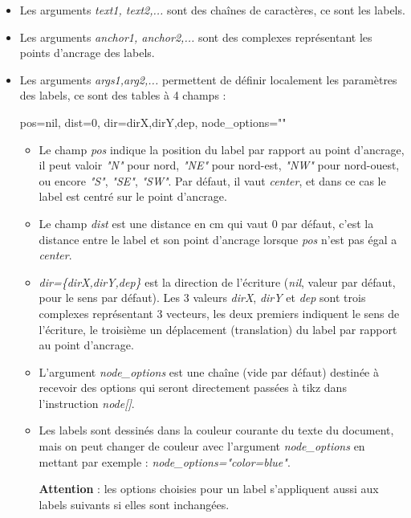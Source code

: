 \documentclass[%
10pt,%
a4paper,%
french,%
]%
{article}%
\begin{document}
\begin{itemize}
    \begin{itemize}
    \item  Les arguments \emph{text1, text2,...} sont des chaînes de caractères, ce sont les labels.
    \item  Les arguments \emph{anchor1, anchor2,...} sont des complexes représentant les points d'ancrage des labels.
    \item  Les arguments \emph{args1,arg2,...}  permettent de définir localement les paramètres des labels, ce sont des tables à 4 champs :
\begin{TeXcode}
    { pos=nil, dist=0, dir={dirX,dirY,dep}, node_options="" }
\end{TeXcode}
        \begin{itemize}
            \item Le champ \emph{pos} indique la position du label par rapport au point d'ancrage, il peut valoir \emph{"N"} pour nord, \emph{"NE"} pour nord-est, \emph{"NW"} pour nord-ouest, ou encore \emph{"S"}, \emph{"SE"}, \emph{"SW"}. Par défaut, il vaut \emph{center}, et dans ce cas le label est centré sur le point  d'ancrage.
            \item Le champ \emph{dist} est une distance en cm qui vaut $0$ par défaut, c'est la distance entre le label et son point d'ancrage lorsque \emph{pos} n'est pas égal a \emph{center}.
            \item \emph{dir=\{dirX,dirY,dep\}} est la direction de l'écriture (\emph{nil}, valeur par défaut, pour le sens par défaut). Les 3 valeurs \emph{dirX}, \emph{dirY} et \emph{dep} sont trois complexes représentant 3 vecteurs, les deux premiers indiquent le sens de l'écriture, le troisième un déplacement (translation) du label par rapport au point d'ancrage.
            \item L'argument \emph{node\_options} est une chaîne (vide par défaut) destinée à recevoir des options qui seront directement passées à tikz dans l'instruction \emph{node{[}{]}}.
            \item Les labels sont dessinés dans la couleur courante du texte du document, mais on peut changer de couleur avec l'argument \emph{node\_options} en mettant par exemple : \emph{node\_options="color=blue"}.
            
            \textbf{Attention} : les options choisies pour un label s'appliquent aussi aux labels suivants si elles sont inchangées.
        \end{itemize}
  \end{itemize}


\end{itemize}
\end{document}
